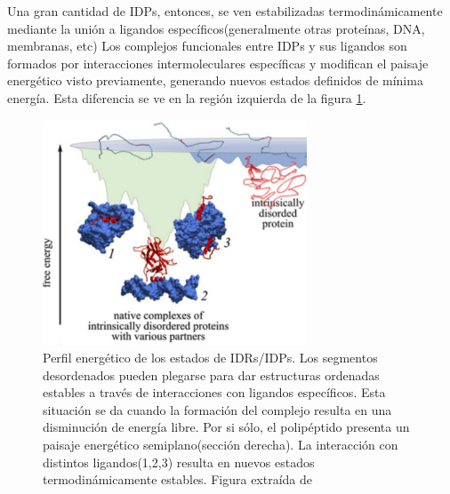 Una gran cantidad de IDPs, entonces, se ven estabilizadas termodinámicamente mediante la unión a ligandos específicos(generalmente otras proteínas, DNA, membranas, etc)
Los complejos funcionales entre IDPs y sus ligandos son formados por interacciones intermoleculares específicas y modifican el paisaje energético visto previamente, generando nuevos estados definidos de mínima energía.
Esta diferencia se ve en la región izquierda de la figura \ref{idpBindingEnLandscape}.


\begin{figure}[h]
\centering
\includegraphics[width=0.7\textwidth]{img/idp-binding-EnLandscape2.png} 
\caption{Perfil energético de los estados de IDRs/IDPs. Los segmentos desordenados pueden plegarse para dar estructuras ordenadas estables a través de interacciones con ligandos específicos.
Esta situación se da cuando la formación del complejo resulta en una disminución de energía libre. 
Por si sólo, el polipéptido presenta un paisaje energético semiplano(sección derecha). La interacción con distintos ligandos(1,2,3) resulta en nuevos estados termodinámicamente estables.
Figura extraída de \cite{turoverov2010protein}}
\label{idpBindingEnLandscape}
\end{figure}

